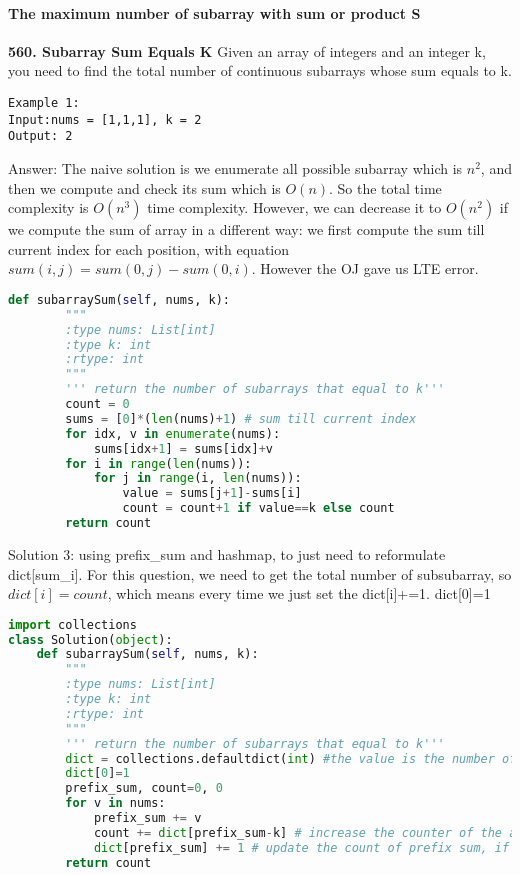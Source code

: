 \documentclass[../main.tex]{subfiles}
\begin{document}
\paragraph{The maximum number of subarray with sum or product S}
\begin{examples}[resume]
\item \textbf{560. Subarray Sum Equals K} Given an array of integers and an integer k, you need to find the total number of continuous subarrays whose sum equals to k.
\begin{lstlisting}[numbers=none]
Example 1:
Input:nums = [1,1,1], k = 2
Output: 2
\end{lstlisting}

Answer: The naive solution is we enumerate all possible subarray which is $n^2$, and then we compute and check its sum which is $O(n)$. So the total time complexity is  $O(n^3)$ time complexity. However, we can decrease it to $O(n^2)$ if we compute the sum of array in a different way: we first compute the sum till current index for each position, with equation $sum(i,j) = sum(0,j)-sum(0,i)$. However the OJ gave us LTE error. 
\begin{lstlisting}[language = Python]
def subarraySum(self, nums, k):
        """
        :type nums: List[int]
        :type k: int
        :rtype: int
        """
        ''' return the number of subarrays that equal to k'''
        count = 0
        sums = [0]*(len(nums)+1) # sum till current index
        for idx, v in enumerate(nums):
            sums[idx+1] = sums[idx]+v
        for i in range(len(nums)):
            for j in range(i, len(nums)):
                value = sums[j+1]-sums[i]
                count = count+1 if value==k else count
        return count
\end{lstlisting}

Solution 3: using prefix\_sum and hashmap, to just need to reformulate dict[sum\_i]. For this question, we need to get the total number of subsubarray, so $dict[i] = count$, which means every time we just set the dict[i]+=1. dict[0]=1
\begin{lstlisting}[language = Python]
import collections
class Solution(object):
    def subarraySum(self, nums, k):
        """
        :type nums: List[int]
        :type k: int
        :rtype: int
        """
        ''' return the number of subarrays that equal to k'''
        dict = collections.defaultdict(int) #the value is the number of the sum occurs
        dict[0]=1
        prefix_sum, count=0, 0
        for v in nums:
            prefix_sum += v
            count += dict[prefix_sum-k] # increase the counter of the appearing value k, default is 0
            dict[prefix_sum] += 1 # update the count of prefix sum, if it is first time, the default value is 0
        return count
\end{lstlisting}


\end{examples}
\end{document}
